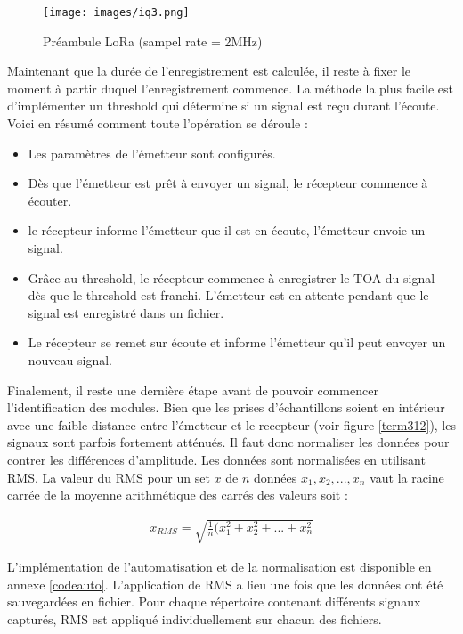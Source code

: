 \clearpage

\begin{figure}[h]
\centering

\texttt{[image: images/iq3.png]}
\caption{Préambule LoRa (sampel rate = 2MHz)}\label{term311}
\end{figure}

Maintenant que la durée de l'enregistrement est calculée, il reste à fixer le moment à partir duquel l'enregistrement commence. La méthode la plus facile est d'implémenter un threshold qui détermine si un signal est reçu durant l'écoute. Voici en résumé comment toute l'opération se déroule :

\begin{itemize}
\item Les paramètres de l'émetteur sont configurés. 
\item Dès que l'émetteur est prêt à envoyer un signal, le récepteur commence à écouter.
\item le récepteur informe l'émetteur que il est en écoute, l'émetteur envoie un signal.
\item Grâce au threshold, le récepteur commence à enregistrer le TOA du signal dès que le threshold est franchi. L'émetteur est en attente pendant que le signal est enregistré dans un fichier.
\item Le récepteur se remet sur écoute et informe l'émetteur qu'il peut envoyer un nouveau signal.
\end{itemize}

Finalement, il reste une dernière étape avant de pouvoir commencer l'identification des modules. Bien que les prises d'échantillons soient en intérieur avec une faible distance entre l'émetteur et le recepteur (voir figure \ref{term312}), les signaux sont parfois fortement atténués. Il faut donc normaliser les données pour contrer les différences d'amplitude. Les données sont normalisées en utilisant \ac{RMS}. La valeur du \ac{RMS} pour un set $x$ de $n$ données ${x_1,x_2,...,x_n}$ vaut la racine carrée de la moyenne arithmétique des carrés des valeurs soit :

\begin{align}
    x_{RMS} = \sqrt{\frac{1}{n}(x_1^2 + x_2^2 + ... + x_n^2}
\end{align}

L'implémentation de l'automatisation et de la normalisation est disponible en annexe \ref{codeauto}. L'application de \ac{RMS} a lieu une fois que les données ont été sauvegardées en fichier. Pour chaque répertoire contenant différents signaux capturés, \ac{RMS} est appliqué individuellement sur chacun des fichiers.


